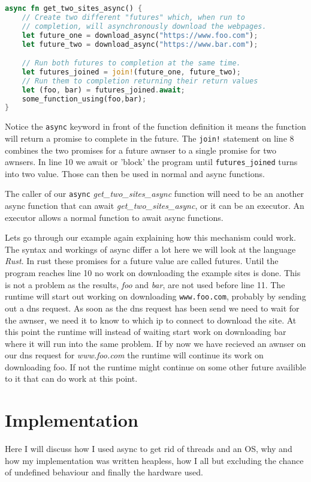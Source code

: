 \documentclass[lang=en, hanging-titles=true]{skrapport}
\begin{document}
\begin{lstlisting}[language=rust, style=boxed, tabsize=2]
async fn get_two_sites_async() {
	// Create two different "futures" which, when run to 
	// completion, will asynchronously download the webpages.
	let future_one = download_async("https://www.foo.com");
	let future_two = download_async("https://www.bar.com");

	// Run both futures to completion at the same time.
	let futures_joined = join!(future_one, future_two);
	// Run them to completion returning their return values
	let (foo, bar) = futures_joined.await;
	some_function_using(foo,bar);
}
\end{lstlisting}

Notice the \texttt{async} keyword in front of the function definition it means the function will return a promise to complete in the future. The \texttt{join!} statement on line 8 combines the two promises for a future awnser to a single promise for two awnsers. In line 10 we await or 'block' the program until \texttt{futures\_joined} turns into two value. Those can then be used in normal and async functions.

The caller of our \texttt{async} \textit{get\_two\_sites\_async} function will need to be an another async function that can await \textit{get\_two\_sites\_async}, or it can be an executor. An executor allows a normal function to await async functions.

Lets go through our example again explaining how this mechanism could work. The syntax and workings of async differ a lot here we will look at the language \textit{Rust}. In rust these promises for a future value are called futures. Until the program reaches line 10 no work on downloading the example sites is done. This is not a problem as the results, \textit{foo} and \textit{bar}, are not used before line 11. The runtime will start out working on downloading \texttt{www.foo.com}, probably by sending out a dns request. As soon as the dns request has been send we need to wait for the awnser, we need it to know to which ip to connect to download the site. At this point the runtime will instead of waiting start work on downloading bar where it will run into the same problem. If by now we have recieved an awnser on our dns request for \textit{www.foo.com} the runtime will continue its work on downloading foo. If not the runtime might continue on some other future availible to it that can do work at this point.

\clearpage
\section{Implementation}
\label{sec:impl}
Here I will discuss how I used async to get rid of threads and an OS, why and how my implementation was written heapless, how I all but excluding the chance of undefined behaviour and finally the hardware used.
\end{document}

